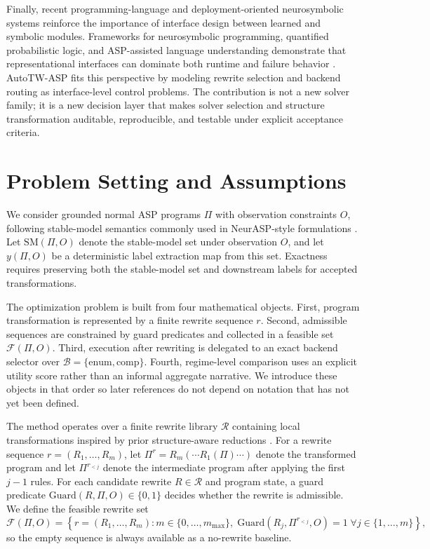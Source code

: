 \documentclass{article} %
\begin{document}
Finally, recent programming-language and deployment-oriented neurosymbolic systems reinforce the importance of interface design between learned and symbolic modules. Frameworks for neurosymbolic programming, quantified probabilistic logic, and ASP-assisted language understanding demonstrate that representational interfaces can dominate both runtime and failure behavior \citep{src_005,src_025,src_032,src_034,src_037}. AutoTW-ASP fits this perspective by modeling rewrite selection and backend routing as interface-level control problems. The contribution is not a new solver family; it is a new decision layer that makes solver selection and structure transformation auditable, reproducible, and testable under explicit acceptance criteria.

\section{Problem Setting and Assumptions}
\label{sec:problem}
We consider grounded normal ASP programs $\Pi$ with observation constraints $O$, following stable-model semantics commonly used in NeurASP-style formulations \citep{src_012,src_019,src_039}. Let $\mathrm{SM}(\Pi,O)$ denote the stable-model set under observation $O$, and let $y(\Pi,O)$ be a deterministic label extraction map from this set. Exactness requires preserving both the stable-model set and downstream labels for accepted transformations.

The optimization problem is built from four mathematical objects. First, program transformation is represented by a finite rewrite sequence $r$. Second, admissible sequences are constrained by guard predicates and collected in a feasible set $\mathcal{F}(\Pi,O)$. Third, execution after rewriting is delegated to an exact backend selector over $\mathcal{B}=\{\text{enum},\text{comp}\}$. Fourth, regime-level comparison uses an explicit utility score rather than an informal aggregate narrative. We introduce these objects in that order so later references do not depend on notation that has not yet been defined.

The method operates over a finite rewrite library $\mathcal{R}$ containing local transformations inspired by prior structure-aware reductions \citep{src_045,src_048,src_039}. For a rewrite sequence $r=(R_1,\ldots,R_m)$, let $\Pi^r=R_m(\cdots R_1(\Pi)\cdots)$ denote the transformed program and let $\Pi^{r_{<j}}$ denote the intermediate program after applying the first $j-1$ rules. For each candidate rewrite $R\in\mathcal{R}$ and program state, a guard predicate $\mathrm{Guard}(R,\Pi,O)\in\{0,1\}$ decides whether the rewrite is admissible. We define the feasible rewrite set
\begin{equation}
\label{eq:feasible}
\mathcal{F}(\Pi,O)=\left\{r=(R_1,\ldots,R_m): m\in\{0,\ldots,m_{\max}\},\; \mathrm{Guard}(R_j,\Pi^{r_{<j}},O)=1\;\forall j\in\{1,\ldots,m\}\right\},
\end{equation}
so the empty sequence is always available as a no-rewrite baseline.
\end{document}
